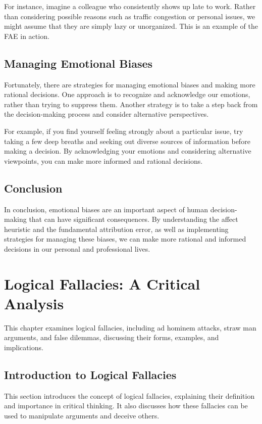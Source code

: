 \documentclass{report}%
\begin{document}
{{{For instance, imagine a colleague who consistently shows up late to work. Rather than considering possible reasons such as traffic congestion or personal issues, we might assume that they are simply lazy or unorganized. This is an example of the FAE in action.

\section{Managing Emotional Biases}

Fortunately, there are strategies for managing emotional biases and making more rational decisions. One approach is to recognize and acknowledge our emotions, rather than trying to suppress them. Another strategy is to take a step back from the decision-making process and consider alternative perspectives.

For example, if you find yourself feeling strongly about a particular issue, try taking a few deep breaths and seeking out diverse sources of information before making a decision. By acknowledging your emotions and considering alternative viewpoints, you can make more informed and rational decisions.

\section{Conclusion}

In conclusion, emotional biases are an important aspect of human decision-making that can have significant consequences. By understanding the affect heuristic and the fundamental attribution error, as well as implementing strategies for managing these biases, we can make more rational and informed decisions in our personal and professional lives.%
\chapter{Logical Fallacies: A Critical Analysis}%
This chapter examines logical fallacies, including ad hominem attacks, straw man arguments, and false dilemmas, discussing their forms, examples, and implications.

%
\section{Introduction to Logical Fallacies}%
This section introduces the concept of logical fallacies, explaining their definition and importance in critical thinking. It also discusses how these fallacies can be used to manipulate arguments and deceive others.

}}}
\end{document}
